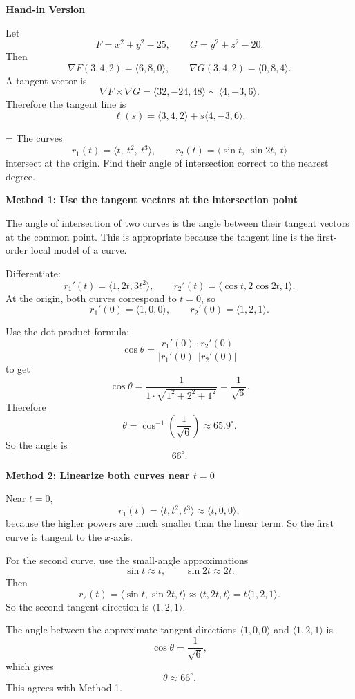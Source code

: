 \documentclass[a4paper,12pt,twocolumn]{article}
\newlength{\problemnumberwidth}
\newenvironment{solutionbox}{\begin{framed}}{\end{framed}}
\newcommand{\problem}[3]{%
  \Needspace{10\baselineskip}%
  \phantomsection\label{#1}%
  \par\vspace{0.8em}%
  \noindent
  \hangindent=\problemnumberwidth
  \hangafter=1
  \makebox[\problemnumberwidth][l]{\textbf{#2.}}#3\par
}
\begin{document}
\begin{solutionbox}
\textbf{Hand-in Version}

Let
\[
F=x^2+y^2-25,\qquad G=y^2+z^2-20.
\]
Then
\[
\nabla F(3,4,2)=\langle 6,8,0\rangle,\qquad
\nabla G(3,4,2)=\langle 0,8,4\rangle.
\]
A tangent vector is
\[
\nabla F\times \nabla G
=\langle 32,-24,48\rangle
\sim \langle 4,-3,6\rangle.
\]
Therefore the tangent line is
\[
\boxed{\ell(s)=\langle 3,4,2\rangle+s\langle 4,-3,6\rangle.}
\]
\end{solutionbox}

\problem{prob:13-2-35}{35}{The curves
\[
r_1(t)=\langle t,\ t^2,\ t^3\rangle,\qquad
r_2(t)=\langle \sin t,\ \sin 2t,\ t\rangle
\]
intersect at the origin. Find their angle of intersection correct to the nearest degree.}

\begin{solutionbox}
\textbf{Method 1: Use the tangent vectors at the intersection point}

\begin{steps}
\item The angle of intersection of two curves is the angle between their tangent vectors at the common point. This is appropriate because the tangent line is the first-order local model of a curve.

\item Differentiate:
\[
r_1'(t)=\langle 1,2t,3t^2\rangle,
\qquad
r_2'(t)=\langle \cos t,2\cos 2t,1\rangle.
\]
At the origin, both curves correspond to \(t=0\), so
\[
r_1'(0)=\langle 1,0,0\rangle,
\qquad
r_2'(0)=\langle 1,2,1\rangle.
\]

\item Use the dot-product formula:
\[
\cos\theta=\frac{r_1'(0)\cdot r_2'(0)}{|r_1'(0)|\,|r_2'(0)|}
\]
to get
\[
\cos\theta=\frac{1}{1\cdot \sqrt{1^2+2^2+1^2}}=\frac{1}{\sqrt6}.
\]
Therefore
\[
\theta=\cos^{-1}\!\left(\frac{1}{\sqrt6}\right)\approx 65.9^\circ.
\]
So the angle is
\[
\boxed{66^\circ.}
\]
\end{steps}
\end{solutionbox}

\begin{solutionbox}
\textbf{Method 2: Linearize both curves near \(t=0\)}

\begin{steps}
\item Near \(t=0\),
\[
r_1(t)=\langle t,t^2,t^3\rangle \approx \langle t,0,0\rangle,
\]
because the higher powers are much smaller than the linear term. So the first curve is tangent to the \(x\)-axis.

\item For the second curve, use the small-angle approximations
\[
\sin t\approx t,\qquad \sin 2t\approx 2t.
\]
Then
\[
r_2(t)=\langle \sin t,\sin 2t,t\rangle \approx \langle t,2t,t\rangle=t\langle 1,2,1\rangle.
\]
So the second tangent direction is \(\langle 1,2,1\rangle\).

\item The angle between the approximate tangent directions \(\langle 1,0,0\rangle\) and \(\langle 1,2,1\rangle\) is
\[
\cos\theta=\frac{1}{\sqrt6},
\]
which gives
\[
\theta\approx 66^\circ.
\]
This agrees with Method 1.
\end{steps}
\end{solutionbox}
\end{document}
